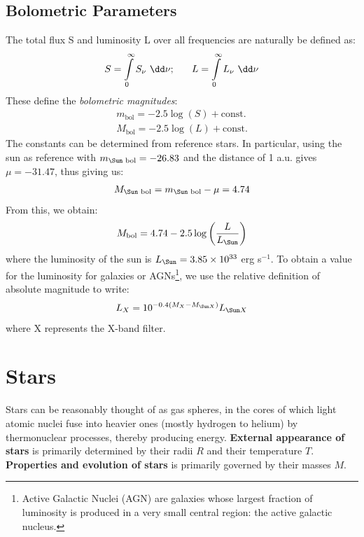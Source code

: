 \documentclass[a4paper,11pt]{report}
\newcommand{\ti}[1]{\textit{#1}}
\newcommand{\tb}[1]{\textbf{#1}}
\begin{document}
\subsection{Bolometric Parameters}
The total flux S and luminosity L over all frequencies are naturally be defined as:
\begin{align*}
  S = \int\limits_0^\infty S_\nu \ \dd \nu; \hspace{4ex} L = \int\limits_0^\infty L_\nu \ \dd \nu
\end{align*}
These define the \ti{bolometric magnitudes}:
\begin{align*}
  m_\text{bol} = -2.5 \log(S) + \text{const.} \\
  M_\text{bol} = -2.5 \log(L) + \text{const.}
\end{align*}
The constants can be determined from reference stars. In particular, using the sun as reference with $m_\text{\Sun bol} = -26.83$ and the distance of 1 a.u. gives $\mu = -31.47$, thus giving us:
\begin{align*}
  M_\text{\Sun bol} = m_\text{\Sun bol} - \mu = 4.74
\end{align*}
From this, we obtain:
\begin{align*}
  M_\text{bol} = 4.74 - 2.5 \log \left( \frac{L}{L_\text{\Sun}} \right)
\end{align*}
where the luminosity of the sun is $L_\text{\Sun} = 3.85 \times 10^{33}$ erg s$^{-1}$. To obtain a value for the luminosity for galaxies or AGNs\footnote{Active Galactic Nuclei (AGN) are galaxies whose largest fraction of luminosity is produced in a very small central region: the active galactic nucleus.}, we use the relative definition of absolute magnitude to write:
\begin{align}
  L_X = 10^{-0.4(M_X - M_{\text{\Sun}X})} L_{\text{\Sun}X} \label{eq:lx defn}
\end{align}
where X represents the X-band filter.

\section{Stars}
Stars can be reasonably thought of as gas spheres, in the cores of which light atomic nuclei fuse into heavier ones (mostly hydrogen to helium) by thermonuclear processes, thereby producing energy. \tb{External appearance of stars} is primarily determined by their radii $R$ and their temperature $T$. \tb{Properties and evolution of stars} is primarily governed by their masses $M$.
\end{document}
